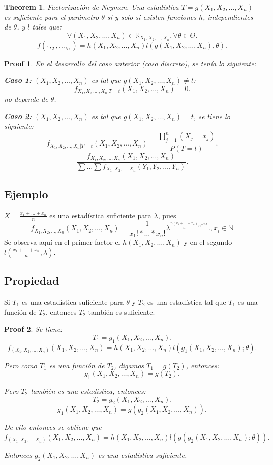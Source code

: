 \documentclass{article}
\newtheorem{mythm}{Theorem}
\newtheorem{myprf}{Proof}
\begin{document}
\begin{mythm}
Factorización de Neyman. Una estadística $T=g(X_{1},X_{2},\ldots,X_{n})$ es suficiente para el parámetro $\theta$ si y solo si existen funciones $h$, independientes de $\theta$, y $l$ tales que:
\[ \forall (X_{1},X_{2},\ldots,X_{n}) \in \mathbb{R}_{X_{1},X_{2},\ldots,X_{n}}, \forall \theta \in \Theta .\]
\[ f(_{1},_{2},\ldots,_{n})=h(X_{1},X_{2},\ldots,X_{n}) l(g(X_{1},X_{2},\ldots,X_{n}),\theta).\]
\end{mythm}
\begin{myprf}
	En el desarrollo del caso anterior (caso discreto), se tenía lo siguiente:

	\textbf{Caso 1:} $(X_{1},X_{2},\ldots,X_{n})$ es tal que $g(X_{1},X_{2},\ldots,X_{n}) \neq t$:
	\[ f_{X_{1},X_{2},\ldots,X_{n}|T=t}(X_{1},X_{2},\ldots,X_{n})=0.\]
	no depende de $\theta$.


	\textbf{Caso 2:} $(X_{1},X_{2},\ldots,X_{n})$ es tal que $g(X_{1},X_{2},\ldots,X_{n})=t$, se tiene lo siguiente:
	\[ f_{X_{1},X_{2},\ldots,X_{n}|T=t}(X_{1},X_{2},\ldots,X_{n})=\frac{\prod_{j=1}^{n}(X_{j}=x_{j})}{P(T=t)}.\]
	\[ \frac{f_{X_{1},X_{2},\ldots,X_{n}}(X_{1},X_{2},\ldots,X_{n})}{\sum \ldots \sum f_{X_{1},X_{2},\ldots,X_{n}}(Y_{1},Y_{2},\ldots,Y_{n})}.\]

\end{myprf}
\subsection{Ejemplo}
$\bar{X}=\frac{x_{1}+\ldots+x_{n}}{n}$ es una estadística suficiente para $\lambda$, pues
\[ f_{X_{1},X_{2},\ldots,X_{n}}(X_{1},X_{2},\ldots,X_{n})=\frac{1}{x_{1}!*\ldots*x_{n}!}\lambda^{\frac{n(x_{1}+\ldots+x_{n})}{n}e^{-n\lambda}}., x_{i} \in \mathbb{N}\]
Se observa aquí en el primer factor el $h(X_{1},X_{2},\ldots,X_{n})$ y en el segundo $l(\frac{x_{1}+\ldots+x_{n}}{n},\lambda)$.

\subsection{Propiedad}
Si $T_{1}$ es una estadística suficiente para $\theta$ y $T_{2}$ es una estadística tal que $T_{1}$ es una función de $T_{2}$, entonces $T_{2}$ también es suficiente.

\begin{myprf}
Se tiene:
\[ T_{1}=g_{1}(X_{1},X_{2},\ldots,X_{n}).\]
\[ f_{(X_{1},X_{2},\ldots,X_{n})}(X_{1},X_{2},\ldots,X_{n})=h(X_{1},X_{2},\ldots,X_{n}) l(g_{1}(X_{1},X_{2},\ldots,X_{n});\theta).\]

Pero como $T_{1}$ es una función de $T_{2}$, digamos $T_{1}=g(T_{2})$, entonces:
\[ g_{1}(X_{1},X_{2},\ldots,X_{n})=g(T_{2}).\]

Pero $T_{2}$ también es una estadística, entonces:
\[ T_{2}=g_{2}(X_{1},X_{2},\ldots,X_{n}).\]
\[ g_{1}(X_{1},X_{2},\ldots,X_{n})=g(g_{2}(X_{1},X_{2},\ldots,X_{n})).\]

De ello entonces se obtiene que 
\[ f_{(X_{1},X_{2},\ldots,X_{n})}(X_{1},X_{2},\ldots,X_{n})=h(X_{1},X_{2},\ldots,X_{n}) l(g(g_{2}(X_{1},X_{2},\ldots,X_{n});\theta)).\]

Entonces $g_{2}(X_{1},X_{2},\ldots,X_{n})$ es una estadística suficiente.
\end{myprf}
\end{document}
